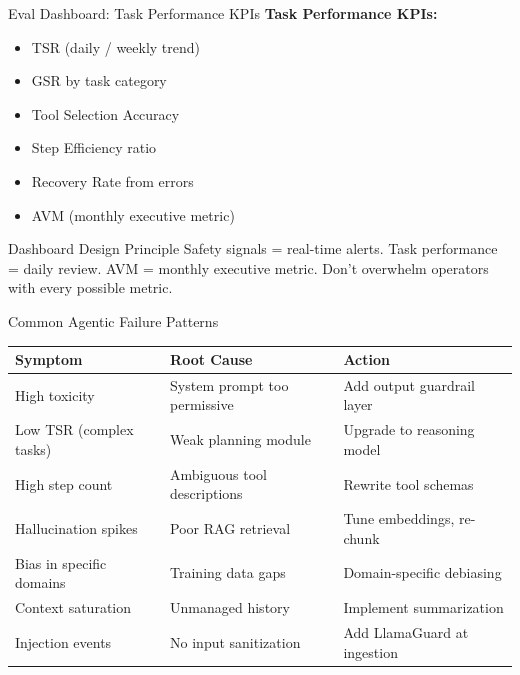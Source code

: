 \documentclass{beamer}       %
\begin{document}
\begin{frame}{Eval Dashboard: Task Performance KPIs}
    \textbf{\color{safegreen} Task Performance KPIs:}
    \begin{itemize}
        \item TSR (daily / weekly trend)
        \item GSR by task category
        \item Tool Selection Accuracy
        \item Step Efficiency ratio
        \item Recovery Rate from errors
        \item AVM (monthly executive metric)
    \end{itemize}
    \vfill
    \begin{alertblock}{Dashboard Design Principle}
        Safety signals = real-time alerts. Task performance = daily review. AVM = monthly executive metric. Don't overwhelm operators with every possible metric.
    \end{alertblock}
\end{frame}

\begin{frame}{Common Agentic Failure Patterns}
    \footnotesize
    \begin{table}
        \centering
        \begin{tabular}{@{}p{2.5cm}p{2.8cm}p{3.5cm}@{}}
            \toprule
            \textbf{Symptom} & \textbf{Root Cause} & \textbf{Action} \\
            \midrule
            High toxicity & System prompt too permissive & Add output guardrail layer \\[2pt]
            Low TSR (complex tasks) & Weak planning module & Upgrade to reasoning model \\[2pt]
            High step count & Ambiguous tool descriptions & Rewrite tool schemas \\[2pt]
            Hallucination spikes & Poor RAG retrieval & Tune embeddings, re-chunk \\[2pt]
            Bias in specific domains & Training data gaps & Domain-specific debiasing \\[2pt]
            Context saturation & Unmanaged history & Implement summarization \\[2pt]
            Injection events & No input sanitization & Add LlamaGuard at ingestion \\
            \bottomrule
        \end{tabular}
    \end{table}
\end{frame}
\end{document}
